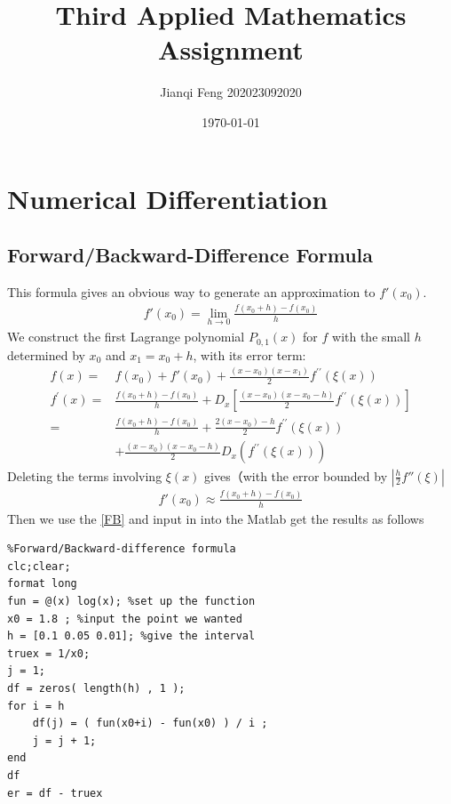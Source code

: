 \documentclass{article}
\title{\vspace{+4cm}\textbf{Third Applied Mathematics Assignment}}
\author{Jianqi Feng 202023092020}
\date{\today}
\begin{document}
\maketitle
\newpage
{}
\setcounter{page}{0}
\tableofcontents

\newpage
\setcounter{page}{1}
\setlength{\parindent}{2em}

\section{Numerical Differentiation}
\subsection{Forward/Backward-Difference Formula}
This formula gives an obvious way to generate an approximation to $f'(x_0)$.
\begin{align}
f'(x_0) = \lim_{h\to 0} \frac{f(x_0+h)-f(x_0)}{h}\nonumber 
\end{align}
We construct
the first Lagrange polynomial $P_{0,1}(x)$ for $f$ with the small $h$ determined by $x_0$ and $x_1=x_0 + h$, with its error term:
\begin{align}
f(x) =& f(x_0) + f'(x_0) + \frac{\left(x-x_{0}\right)\left(x-x_1\right)}{2} f^{\prime \prime}(\xi(x)) \nonumber\\
f^{\prime}(x)=& \frac{f\left(x_{0}+h\right)-f\left(x_{0}\right)}{h}+D_{x}\left[\frac{\left(x-x_{0}\right)\left(x-x_{0}-h\right)}{2} f^{\prime \prime}(\xi(x))\right] \nonumber \\
=& \frac{f\left(x_{0}+h\right)-f\left(x_{0}\right)}{h}+\frac{2\left(x-x_{0}\right)-h}{2} f^{\prime \prime}(\xi(x)) \nonumber\\
&+\frac{\left(x-x_{0}\right)\left(x-x_{0}-h\right)}{2} D_{x}\left(f^{\prime \prime}(\xi(x))\right) \nonumber
\end{align}
Deleting the terms involving $\xi(x)$ gives（with the error bounded by $|\frac{h}{2}f''(\xi)|$
\begin{align}
f'(x_0) \approx  \frac{f(x_0+h)-f(x_0)}{h}
\label{FB}
\end{align}
Then we use the \ref{FB} and input in into the Matlab get the results as follows
\begin{lstlisting}
%Forward/Backward-difference formula
clc;clear;
format long
fun = @(x) log(x); %set up the function
x0 = 1.8 ; %input the point we wanted
h = [0.1 0.05 0.01]; %give the interval
truex = 1/x0;
j = 1;
df = zeros( length(h) , 1 );
for i = h
    df(j) = ( fun(x0+i) - fun(x0) ) / i ;
    j = j + 1;
end
df
er = df - truex
\end{lstlisting}
\end{document}
